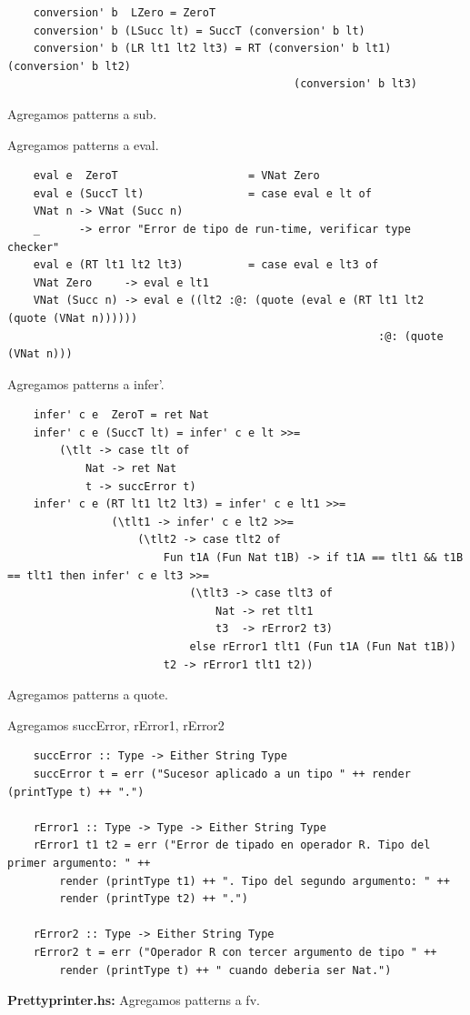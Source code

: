 \documentclass{article}
\begin{document}
	\begin{lstlisting}
	conversion' b  LZero = ZeroT
	conversion' b (LSucc lt) = SuccT (conversion' b lt)
	conversion' b (LR lt1 lt2 lt3) = RT (conversion' b lt1) (conversion' b lt2) 
											(conversion' b lt3)
	\end{lstlisting}
	
	Agregamos patterns a sub.
	
	Agregamos patterns a eval.
	\begin{lstlisting}
	eval e  ZeroT                    = VNat Zero
	eval e (SuccT lt)                = case eval e lt of
	VNat n -> VNat (Succ n)
	_      -> error "Error de tipo de run-time, verificar type checker"
	eval e (RT lt1 lt2 lt3)          = case eval e lt3 of
	VNat Zero     -> eval e lt1
	VNat (Succ n) -> eval e ((lt2 :@: (quote (eval e (RT lt1 lt2 (quote (VNat n))))))
														 :@: (quote (VNat n)))
	\end{lstlisting}
	\newpage
	Agregamos patterns a infer'.
	\begin{lstlisting}
	infer' c e  ZeroT = ret Nat
	infer' c e (SuccT lt) = infer' c e lt >>=
		(\tlt -> case tlt of
			Nat -> ret Nat
			t -> succError t)
	infer' c e (RT lt1 lt2 lt3) = infer' c e lt1 >>=
				(\tlt1 -> infer' c e lt2 >>=
					(\tlt2 -> case tlt2 of
						Fun t1A (Fun Nat t1B) -> if t1A == tlt1 && t1B == tlt1 then infer' c e lt3 >>=
							(\tlt3 -> case tlt3 of
								Nat -> ret tlt1
								t3  -> rError2 t3)
							else rError1 tlt1 (Fun t1A (Fun Nat t1B))
						t2 -> rError1 tlt1 t2))
	\end{lstlisting}
	Agregamos patterns a quote.
	
	Agregamos succError, rError1, rError2 	
	\begin{lstlisting}
	succError :: Type -> Either String Type
	succError t = err ("Sucesor aplicado a un tipo " ++ render (printType t) ++ ".")
	
	rError1 :: Type -> Type -> Either String Type
	rError1 t1 t2 = err ("Error de tipado en operador R. Tipo del primer argumento: " ++
		render (printType t1) ++ ". Tipo del segundo argumento: " ++  
		render (printType t2) ++ ".")
	
	rError2 :: Type -> Either String Type
	rError2 t = err ("Operador R con tercer argumento de tipo " ++
		render (printType t) ++ " cuando deberia ser Nat.")
	\end{lstlisting}
	\textbf{Prettyprinter.hs:} Agregamos patterns a fv.
	
\end{document}
